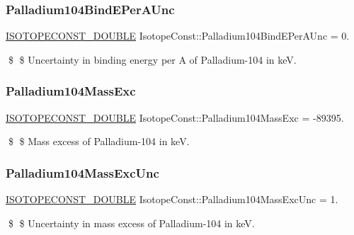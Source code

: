\subsubsection{\texorpdfstring{Palladium104\+Bind\+E\+Per\+A\+Unc}{Palladium104BindEPerAUnc}}
{\footnotesize\ttfamily \mbox{\hyperlink{group___isotope_const-_macros_ga8f45a7272ce02c0b4c65c44636ed719a}{I\+S\+O\+T\+O\+P\+E\+C\+O\+N\+S\+T\+\_\+\+D\+O\+U\+B\+LE}} Isotope\+Const\+::\+Palladium104\+Bind\+E\+Per\+A\+Unc = 0.}

\$ \$ Uncertainty in binding energy per A of Palladium-\/104 in keV. \mbox{\label{group___isotope_const-_palladium-_pd104_ga8917e5e0f6ca3de3f185956cdf75ec8b}} 
\subsubsection{\texorpdfstring{Palladium104\+Mass\+Exc}{Palladium104MassExc}}
{\footnotesize\ttfamily \mbox{\hyperlink{group___isotope_const-_macros_ga8f45a7272ce02c0b4c65c44636ed719a}{I\+S\+O\+T\+O\+P\+E\+C\+O\+N\+S\+T\+\_\+\+D\+O\+U\+B\+LE}} Isotope\+Const\+::\+Palladium104\+Mass\+Exc = -\/89395.}

\$ \$ Mass excess of Palladium-\/104 in keV. \mbox{\label{group___isotope_const-_palladium-_pd104_ga24c7f30c73201bdd283305a430203434}} 
\subsubsection{\texorpdfstring{Palladium104\+Mass\+Exc\+Unc}{Palladium104MassExcUnc}}
{\footnotesize\ttfamily \mbox{\hyperlink{group___isotope_const-_macros_ga8f45a7272ce02c0b4c65c44636ed719a}{I\+S\+O\+T\+O\+P\+E\+C\+O\+N\+S\+T\+\_\+\+D\+O\+U\+B\+LE}} Isotope\+Const\+::\+Palladium104\+Mass\+Exc\+Unc = 1.}

\$ \$ Uncertainty in mass excess of Palladium-\/104 in keV. \mbox{\label{group___isotope_const-_palladium-_pd104_gad513aa0abc2b9c4267a639fcf7c7e4ca}} 
